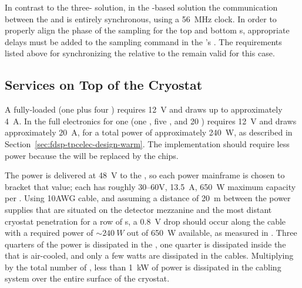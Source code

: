 In contrast to the three- solution, %
in the -based  solution %
the communication between the  and 
 is entirely synchronous, using a \SI{56}{MHz} 
clock. In order to properly align the phase of the
 sampling for the top and bottom s,
appropriate delays must be added to the sampling
command in the 's . %
The requirements listed above for synchronizing 
the  relative to the  remain
valid for this case. %



\subsection{Services on Top of the Cryostat}
\label{sec:fdsp-tpcelec-design-services}

A fully-loaded  (one  plus four ) 
requires \SI{12}{V} and draws up to approximately \SI{4}{A}.  In 
 the full electronics for one  (one , 
five , and \num{20} ) requires \SI{12}{V} and 
draws approximately \SI{20}{A}, for a total power of approximately 
\SI{240}{W}, as described in Section~\ref{sec:fdsp-tpcelec-design-warm}. 
The  implementation should require less power because 
the  will be replaced by the  chips.

The  power is delivered at \SI{48}{V} to the , 
so each  power mainframe is chosen to bracket that value; 
each has roughly \numrange{30}{60}{V}, \SI{13.5}{A}, \SI{650}{W} 
maximum capacity per . Using 10AWG cable, and assuming
a distance of \SI{20}{m} between the  power supplies 
that are situated on the detector mezzanine and the most distant
cryostat penetration for a row of s, a \SI{0.8}{V} 
drop should occur along the cable with a required power of 
$\sim\SI{240}{W}$ out of \SI{650}{W} available, as measured
in . Three quarters of the power is dissipated in
the , one quarter is dissipated inside the  
that is air-cooled, and only a few watts are dissipated in the cables. 
Multiplying by the total number of , less 
than \SI{1}{kW} of power is dissipated in the cabling system 
over the entire surface of the cryostat. 

